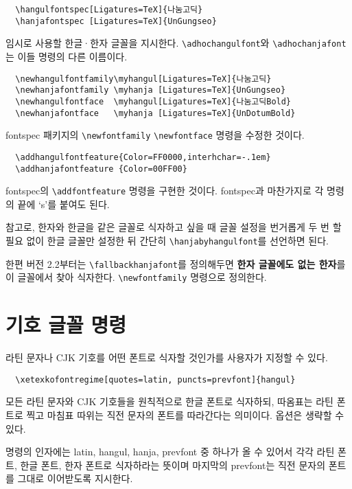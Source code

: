 \documentclass[a4paper]{article}
\def\cs#1{\texttt{\textbackslash #1}}
\def\hemph#1{\textsf{\bfseries #1}}
\begin{document}
\begin{verbatim}
  \hangulfontspec[Ligatures=TeX]{나눔고딕}
  \hanjafontspec [Ligatures=TeX]{UnGungseo}
\end{verbatim}
임시로 사용할 한글·한자 글꼴을 지시한다.
\cs{adhochangulfont}와 \cs{adhochanjafont}는 이들 명령의 다른 이름이다.

\begin{verbatim}
  \newhangulfontfamily\myhangul[Ligatures=TeX]{나눔고딕}
  \newhanjafontfamily \myhanja [Ligatures=TeX]{UnGungseo}
  \newhangulfontface  \myhangul[Ligatures=TeX]{나눔고딕Bold}
  \newhanjafontface   \myhanja [Ligatures=TeX]{UnDotumBold}
\end{verbatim}
fontspec 패키지의 \verb+\newfontfamily+ \verb+\newfontface+ 명령을
수정한 것이다.

\begin{verbatim}
  \addhangulfontfeature{Color=FF0000,interhchar=-.1em}
  \addhanjafontfeature {Color=00FF00}
\end{verbatim}
fontspec의 \verb+\addfontfeature+ 명령을 구현한 것이다.
fontspec과 마찬가지로 각 명령의 끝에 `s'를 붙여도 된다.

\smallskip
참고로, 한자와 한글을 같은 글꼴로 식자하고 싶을 때 글꼴 설정을
번거롭게 두 번 할 필요 없이 한글 글꼴만 설정한 뒤 간단히
  \cs{hanjabyhangulfont}를 선언하면 된다.

한편 버전 2.2부터는 \cs{fallbackhanjafont}를 정의해두면
\hemph{한자 글꼴에도 없는 한자}를
이 글꼴에서 찾아 식자한다. \verb|\newfontfamily| 명령으로 정의한다.


\section{기호 글꼴 명령}
라틴 문자나 CJK 기호를 어떤 폰트로 식자할 것인가를 사용자가 지정할 수 있다.
\begin{verbatim}
  \xetexkofontregime[quotes=latin, puncts=prevfont]{hangul}
\end{verbatim}
모든 라틴 문자와 CJK 기호들을 원칙적으로 한글 폰트로 식자하되,
따옴표는 라틴 폰트로 찍고 마침표 따위는 직전 문자의 폰트를 따라간다는 의미이다.
옵션은 생략할 수 있다.

명령의 인자에는 latin, hangul, hanja, prevfont 중 하나가 올 수 있어서
각각 라틴 폰트, 한글 폰트, 한자 폰트로 식자하라는 뜻이며
마지막의 prevfont는 직전 문자의 폰트를 그대로 이어받도록 지시한다.
\end{document}
